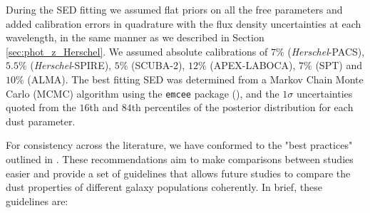 During the SED fitting we assumed flat priors on all the free parameters and added calibration errors in quadrature with the flux density uncertainties at each wavelength, in the same manner as we described in Section \ref{sec:phot_z_Herschel}. We assumed absolute calibrations of $7\%$ (\textit{Herschel}-PACS), $5.5\%$ (\textit{Herschel}-SPIRE), $5\%$ (SCUBA-2), $12\%$ (APEX-LABOCA), $7\%$ (SPT) and $10\%$ (ALMA). The best fitting SED was determined from a Markov Chain Monte Carlo (MCMC) algorithm using the \texttt{emcee} package (\citealt{Foreman-Mackey_2013}), and the $1\sigma$ uncertainties quoted from the $16$th and $84$th percentiles of the posterior distribution for each dust parameter.

For consistency across the literature, we have conformed to the "best practices" outlined in \citealt{Drew_2022}. These recommendations aim to make comparisons between studies easier and provide a set of guidelines that allows future studies to compare the dust properties of different galaxy populations coherently. In brief, these guidelines are: 

